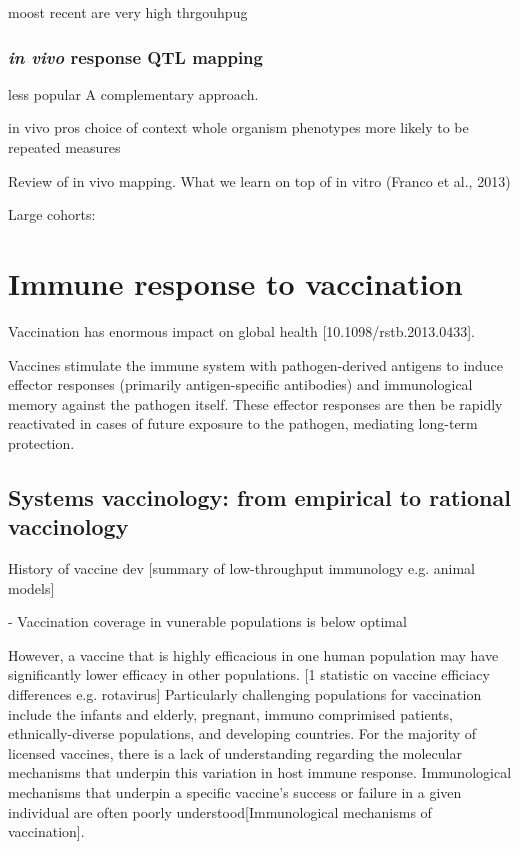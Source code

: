 moost recent are very high thrgouhpug

\subsubsection{\textit{in vivo} response QTL mapping}

less popular
A complementary approach.

in vivo pros
    choice of context 
    whole organism phenotypes
    more likely to be repeated measures

Review of in vivo mapping.
What we learn on top of in vitro
(Franco et al., 2013)

Large cohorts: 

\section{Immune response to vaccination}

Vaccination has enormous impact on global health [10.1098/rstb.2013.0433].

Vaccines stimulate the immune system with pathogen-derived antigens to induce effector responses (primarily antigen-specific antibodies) and immunological memory against the pathogen itself.
These effector responses are then be rapidly reactivated in cases of future exposure to the pathogen, mediating long-term protection.


\subsection{Systems vaccinology: from empirical to rational vaccinology}

History of vaccine dev
[summary of low-throughput immunology e.g. animal models]  

- Vaccination coverage in vunerable populations is below optimal

However, a vaccine that is highly efficacious in one human population may have significantly lower efficacy in other populations.
[1 statistic on vaccine efficiacy differences e.g. rotavirus]
Particularly challenging populations for vaccination include the infants and elderly, pregnant, immuno comprimised patients, ethnically-diverse populations, and developing countries.
For the majority of licensed vaccines, there is a lack of understanding regarding the molecular mechanisms that underpin this variation in host immune response.
Immunological mechanisms that underpin a specific vaccine's success or failure in a given individual are often poorly understood[Immunological mechanisms of vaccination]. 

